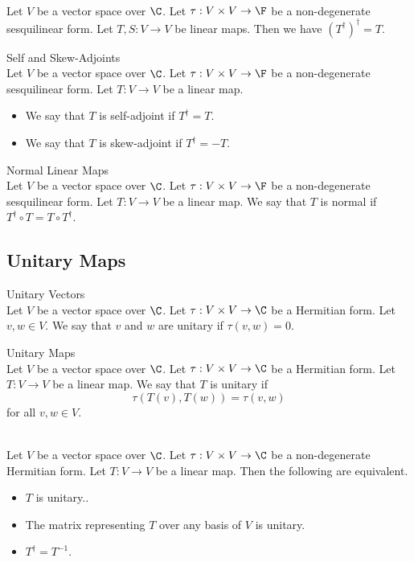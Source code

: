 \documentclass[a4paper]{article}
\begin{document}
\begin{prp}{}{}\\
Let $V$ be a vector space over $\C$. Let $\tau:V\times V\to\F$ be a non-degenerate sesquilinear form. Let $T,S:V\to V$ be linear maps. Then we have $(T^\dagger)^\dagger=T$. 
\end{prp}

\begin{defn}{Self and Skew-Adjoints}{}\\
Let $V$ be a vector space over $\C$. Let $\tau:V\times V\to\F$ be a non-degenerate sesquilinear form. Let $T:V\to V$ be a linear map. 
\begin{itemize}
\item We say that $T$ is self-adjoint if $T^\dagger=T$. 
\item We say that $T$ is skew-adjoint if $T^\dagger=-T$. 
\end{itemize}
\end{defn}

\begin{defn}{Normal Linear Maps}{}\\
Let $V$ be a vector space over $\C$. Let $\tau:V\times V\to\F$ be a non-degenerate sesquilinear form. Let $T:V\to V$ be a linear map. We say that $T$ is normal if $T^\dagger\circ T=T\circ T^\dagger$. 
\end{defn}

\subsection{Unitary Maps}
\begin{defn}{Unitary Vectors}{}\\
Let $V$ be a vector space over $\C$. Let $\tau:V\times V\to\C$ be a Hermitian form. Let $v,w\in V$. We say that $v$ and $w$ are unitary if $\tau(v,w)=0$. 
\end{defn}

\begin{defn}{Unitary Maps}{}\\
Let $V$ be a vector space over $\C$. Let $\tau:V\times V\to\C$ be a Hermitian form. Let $T:V\to V$ be a linear map. We say that $T$ is unitary if $$\tau(T(v),T(w))=\tau(v,w)$$ for all $v,w\in V$. 
\end{defn}

\begin{prp}{}{}\\
Let $V$ be a vector space over $\C$. Let $\tau:V\times V\to\C$ be a non-degenerate Hermitian form. Let $T:V\to V$ be a linear map. Then the following are equivalent. 
\begin{itemize}
\item $T$ is unitary.. 
\item The matrix representing $T$ over any basis of $V$ is unitary. 
\item $T^\dagger=T^{-1}$. 
\end{itemize}
\end{prp}
\end{document}
